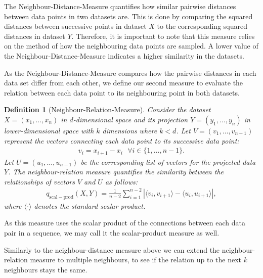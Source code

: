 \documentclass[pdftex,12pt,a4paper]{report}
\newtheorem{definition}{Definition}[section]
\begin{document}
The Neighbour-Distance-Measure quantifies how similar pairwise distances between data points in two datasets are.
This is done by comparing the squared distances between successive points in dataset $X$ to the corresponding squared distances in dataset $Y$.
Therefore, it is important to note that this measure relies on the method of how the neighbouring data points are sampled.
A lower value of the Neighbour-Distance-Measure indicates a higher similarity in the datasets.

As the Neighbour-Distance-Measure compares how the pairwise distances in each data set differ from each other, we define our second measure to evaluate the relation between each data point to its neighbouring point in both datasets.
\begin{definition}[Neighbour-Relation-Measure]
    Consider the dataset $X = (x_1, \dots, x_n)$ in $d$-dimensional space and its projection $Y = (y_1, \dots, y_n)$ in lower-dimensional space with $k$ dimensions where $k < d$.
    Let $V = (v_1, \dots, v_{n-1})$ represent the vectors connecting each data point to its successive data point:
    \begin{align*}
        v_i=x_{i+1} - x_i \text{   } \forall i \in \{1, \dots,n-1\}.
    \end{align*}
    Let $U = (u_1, \dots, u_{n-1})$ be the corresponding list of vectors for the projected data $Y$. The neighbour-relation measure quantifies the similarity between the relationships of vectors $V$ and $U$ as follows:
    \begin{align*}
        q_{\mathrm{scal-prod}} (X,Y) = \frac{1}{n-2}\sum_{i=1}^{n-2} |\langle v_i,v_{i+1} \rangle - \langle u_i,u_{i+1} \rangle|,
    \end{align*}
    where $\langle \cdot \rangle$ denotes the standard scalar product.
\end{definition}
As this measure uses the scalar product of the connections between each data pair in a sequence, we may call it the scalar-product measure as well.

Similarly to the neighbour-distance measure above we can extend the neighbour-relation measure to multiple neighbours, to see if the relation up to the next $k$ neighbours stays the same.
\end{document}
